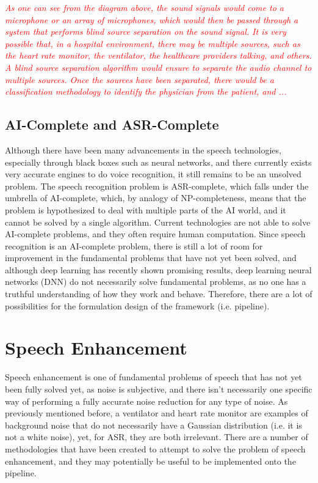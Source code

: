 \textcolor{red}{\textit{As one can see from the diagram above, the sound signals would come to a microphone or an array of microphones, which would then be passed through a system that performs blind source separation on the sound signal. It is very possible that, in a hospital environment, there may be multiple sources, such as the heart rate monitor, the ventilator, the healthcare providers talking, and others. A blind source separation algorithm would ensure to separate the audio channel to multiple sources. Once the sources have been separated, there would be a classification methodology to identify the physician from the patient, and ...}}

\subsection{AI-Complete and ASR-Complete}
Although there have been many advancements in the speech technologies, especially through black boxes such as neural networks, and there currently exists very accurate engines to do voice recognition, it still remains to be an unsolved problem. The speech recognition problem is ASR-complete, which falls under the umbrella of AI-complete, which, by analogy of NP-completeness, means that the problem is hypothesized to deal with multiple parts of the AI world, and it cannot be solved by a single algorithm. Current technologies are not able to solve AI-complete problems, and they often require human computation. Since speech recognition is an AI-complete problem, there is still a lot of room for improvement in the fundamental problems that have not yet been solved, and although deep learning has recently shown promising results, deep learning neural networks (DNN) do not necessarily solve fundamental problems, as no one has a truthful understanding of how they work and behave. Therefore, there are a lot of possibilities for the formulation design of the framework (i.e. pipeline).

\section{Speech Enhancement}
Speech enhancement is one of fundamental problems of speech that has not yet been fully solved yet, as noise is subjective, and there isn't necessarily one specific way of performing a fully accurate noise reduction for any type of noise. As previously mentioned before, a ventilator and heart rate monitor are examples of background noise that do not necessarily have a Gaussian distribution (i.e. it is not a white noise), yet, for ASR, they are both irrelevant. There are a number of methodologies that have been created to attempt to solve the problem of speech enhancement, and they may potentially be useful to be implemented onto the pipeline.

